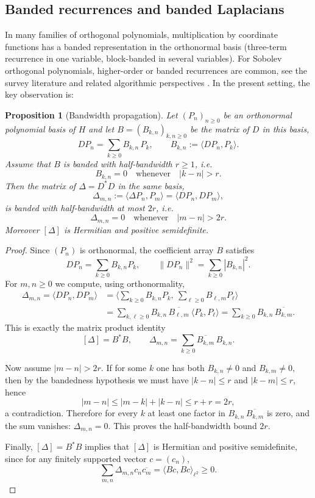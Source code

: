 \documentclass{amsart}
\numberwithin{equation}{section}
\newtheorem{proposition}[theorem]{Proposition}
\theoremstyle{definition}
\theoremstyle{remark}
\begin{document}
\subsection{Banded recurrences and banded Laplacians}

In many families of orthogonal polynomials, multiplication by coordinate functions has a banded
representation in the orthonormal basis (three-term recurrence in one variable, block-banded in
several variables). For Sobolev orthogonal polynomials, higher-order or banded recurrences are common,
see the survey literature \cite{MarcellanXuSurvey} and related algorithmic perspectives \cite{VanBuggenhout2023}.
In the present setting, the key observation is:

\begin{proposition}[Bandwidth propagation]\label{prop:bandwidth}
Let $(P_n)_{n\ge 0}$ be an orthonormal polynomial basis of $H$ and let
$B=(B_{k,n})_{k,n\ge 0}$ be the matrix of $D$ in this basis,
\[
DP_n=\sum_{k\ge 0} B_{k,n}\,P_k,\qquad B_{k,n}:=\langle DP_n,P_k\rangle.
\]
Assume that $B$ is banded with half-bandwidth $r\ge 1$, i.e.
\[
B_{k,n}=0 \quad\text{whenever}\quad |k-n|>r .
\]
Then the matrix of $\Delta=D^*D$ in the same basis,
\[
\Delta_{m,n}:=\langle \Delta P_n,P_m\rangle=\langle DP_n,DP_m\rangle,
\]
is banded with half-bandwidth at most $2r$, i.e.
\[
\Delta_{m,n}=0\quad\text{whenever}\quad |m-n|>2r.
\]
Moreover $[\Delta]$ is Hermitian and positive semidefinite.
\end{proposition}

\begin{proof}
Since $(P_n)$ is orthonormal, the coefficient array $B$ satisfies
\[
DP_n=\sum_{k\ge 0} B_{k,n}P_k,\qquad
\|DP_n\|^2=\sum_{k\ge 0}|B_{k,n}|^2.
\]
For $m,n\ge 0$ we compute, using orthonormality,
\begin{align*}
\Delta_{m,n}
=\langle DP_n,DP_m\rangle
&=\Big\langle \sum_{k\ge 0} B_{k,n}P_k,\ \sum_{\ell\ge 0} B_{\ell,m}P_\ell\Big\rangle \\
&=\sum_{k,\ell\ge 0} B_{k,n}\,\overline{B_{\ell,m}}\ \langle P_k,P_\ell\rangle
=\sum_{k\ge 0} B_{k,n}\,\overline{B_{k,m}}.
\end{align*}
This is exactly the matrix product identity
\[
[\Delta]=B^*B,\qquad \Delta_{m,n}=\sum_{k\ge 0}\overline{B_{k,m}}\,B_{k,n}.
\]

Now assume $|m-n|>2r$. If for some $k$ one has both $B_{k,n}\neq 0$ and $B_{k,m}\neq 0$,
then by the bandedness hypothesis we must have $|k-n|\le r$ and $|k-m|\le r$, hence
\[
|m-n|\le |m-k|+|k-n|\le r+r=2r,
\]
a contradiction. Therefore for every $k$ at least one factor in
$B_{k,n}\,\overline{B_{k,m}}$ is zero, and the sum vanishes:
$\Delta_{m,n}=0$. This proves the half-bandwidth bound $2r$.

Finally, $[\Delta]=B^*B$ implies that $[\Delta]$ is Hermitian and positive semidefinite, since
for any finitely supported vector $c=(c_n)$,
\[
\sum_{m,n}\Delta_{m,n}c_n\overline{c_m}
=\langle Bc,Bc\rangle_{\ell^2}\ge 0.
\]
\end{proof}
\end{document}

